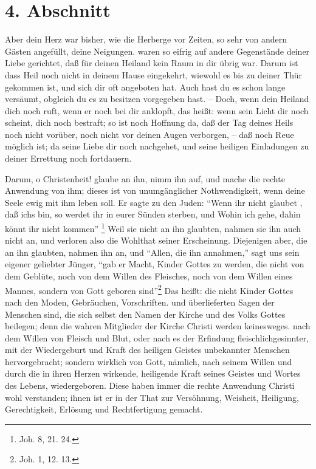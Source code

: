 \section{4. Abschnitt}

Aber dein Herz war bisher, wie die Herberge vor Zeiten, so sehr von andern Gästen angefüllt, deine Neigungen. waren so eifrig auf andere Gegenstände deiner Liebe gerichtet, daß für deinen Heiland kein Raum in dir übrig war. Darum ist dass Heil noch nicht in deinem Hause eingekehrt, wiewohl es bis zu deiner Thür gekommen ist, und sich dir oft angeboten hat. Auch hast du es schon lange versäumt, obgleich du es zu besitzen vorgegeben hast. – Doch, wenn dein Heiland dich noch ruft, wenn er noch bei dir anklopft, das heißt: wenn sein Licht dir noch scheint, dich noch bestraft; so ist noch Hoffnung da, daß der Tag deines Heils noch nicht vorüber, noch nicht vor deinen Augen verborgen, – daß noch Reue möglich ist; da seine Liebe dir noch nachgehet, und seine heiligen Einladungen zu deiner Errettung noch fortdauern.

Darum, o Christenheit! glaube an ihn, nimm ihn auf, und mache die rechte Anwendung von ihm; dieses ist von unumgänglicher Nothwendigkeit, wenn deine Seele ewig mit ihm leben soll. Er sagte zu den Juden: "`Wenn ihr nicht glaubet , daß ichs bin, so werdet ihr in eurer Sünden sterben, und Wohin ich gehe, dahin könnt ihr nicht kommen"' \footnote{Joh. 8, 21. 24.} Weil sie nicht an ihn glaubten, nahmen sie ihn auch nicht an, und verloren also die Wohlthat seiner Erscheinung. Diejenigen aber, die an ihn glaubten, nahmen ihn an, und "`Allen, die ihn annahmen,"' sagt uns sein eigener geliebter Jünger, "`gab er Macht, Kinder Gottes zu werden, die nicht von dem Geblüte, noch von dem Willen des Fleisches, noch von dem Willen eines Mannes, sondern von Gott geboren sind"'\footnote{Joh. 1, 12. 13.}  Das heißt: die nicht Kinder Gottes nach den Moden, Gebräuchen, Vorschriften. und überlieferten Sagen der Menschen sind, die sich selbst den Namen der Kirche und des Volks Gottes beilegen; denn die wahren Mitglieder der Kirche Christi werden keinesweges. nach dem Willen von Fleisch und Blut, oder nach es der Erfindung fleischlichgesinnter, mit der Wiedergeburt und Kraft des heiligen Geistes unbekannter Menschen hervorgebracht; sondern wirklich von Gott, nämlich, nach seinem Willen und  durch die in ihren Herzen wirkende, heiligende Kraft seines Geistes und Wortes des Lebens, wiedergeboren. Diese haben immer die rechte Anwendung Christi wohl verstanden; ihnen ist er in der That zur Versöhnung, Weisheit, Heiligung, Gerechtigkeit, Erlösung und Rechtfertigung gemacht.

